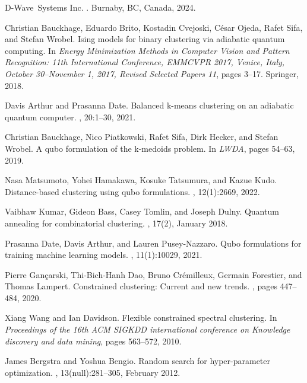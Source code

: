 \documentclass[showpacs,twocolumn,superscriptaddress]{revtex4-2}
\begin{document}
\begin{thebibliography}{10}
D-Wave~Systems Inc.
.
\newblock Burnaby, BC, Canada, 2024.

Christian Bauckhage, Eduardo Brito, Kostadin Cvejoski, C{\'e}sar Ojeda, Rafet
  Sifa, and Stefan Wrobel.
\newblock Ising models for binary clustering via adiabatic quantum computing.
\newblock In {\em Energy Minimization Methods in Computer Vision and Pattern
  Recognition: 11th International Conference, EMMCVPR 2017, Venice, Italy,
  October 30--November 1, 2017, Revised Selected Papers 11}, pages 3--17.
  Springer, 2018.

Davis Arthur and Prasanna Date.
\newblock Balanced k-means clustering on an adiabatic quantum computer.
, 20:1--30, 2021.

Christian Bauckhage, Nico Piatkowski, Rafet Sifa, Dirk Hecker, and Stefan
  Wrobel.
\newblock A qubo formulation of the k-medoids problem.
\newblock In {\em LWDA}, pages 54--63, 2019.

Nasa Matsumoto, Yohei Hamakawa, Kosuke Tatsumura, and Kazue Kudo.
\newblock Distance-based clustering using qubo formulations.
, 12(1):2669, 2022.

Vaibhaw Kumar, Gideon Bass, Casey Tomlin, and Joseph Dulny.
\newblock Quantum annealing for combinatorial clustering.
, 17(2), January 2018.

Prasanna Date, Davis Arthur, and Lauren Pusey-Nazzaro.
\newblock Qubo formulations for training machine learning models.
, 11(1):10029, 2021.

Pierre Gan{\c{c}}arski, Thi-Bich-Hanh Dao, Bruno Cr{\'e}milleux, Germain
  Forestier, and Thomas Lampert.
\newblock Constrained clustering: Current and new trends.
, pages 447--484, 2020.

Xiang Wang and Ian Davidson.
\newblock Flexible constrained spectral clustering.
\newblock In {\em Proceedings of the 16th ACM SIGKDD international conference
  on Knowledge discovery and data mining}, pages 563--572, 2010.

James Bergstra and Yoshua Bengio.
\newblock Random search for hyper-parameter optimization.
, 13(null):281–305, February 2012.


\end{thebibliography}
\end{document}
